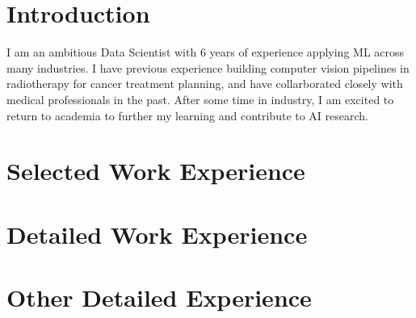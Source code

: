 \documentclass[11pt,a4paper]{moderncv}
\begin{document}
\makecvtitle

\section*{Introduction}
I am an ambitious Data Scientist with 6 years of experience applying ML across many industries. I have previous experience building computer vision pipelines in radiotherapy for cancer treatment planning, and have collarborated closely with medical professionals in the past. After some time in industry, I am excited to return to academia to further my learning and contribute to AI research.


\section{Selected Work Experience}







\newpage
\section{Detailed Work Experience}





\section{Other Detailed Experience}

\end{document}
